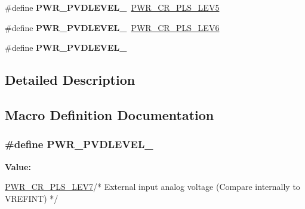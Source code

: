 \begin{DoxyCompactItemize}
\item 
\#define {\bfseries P\+W\+R\+\_\+\+P\+V\+D\+L\+E\+V\+E\+L\+\_}~\hyperlink{group___peripheral___registers___bits___definition_ga326781d09a07b4d215424fbbae11b7b2}{P\+W\+R\+\_\+\+C\+R\+\_\+\+P\+L\+S\+\_\+\+L\+E\+V5}\hypertarget{group___p_w_r___p_v_d__detection__level_ga46a1476440945c2b6426b4973172f24b}{}\label{group___p_w_r___p_v_d__detection__level_ga46a1476440945c2b6426b4973172f24b}

\item 
\#define {\bfseries P\+W\+R\+\_\+\+P\+V\+D\+L\+E\+V\+E\+L\+\_}~\hyperlink{group___peripheral___registers___bits___definition_gaaff17e9c7fe7d837523b1e9a2f4e9baf}{P\+W\+R\+\_\+\+C\+R\+\_\+\+P\+L\+S\+\_\+\+L\+E\+V6}\hypertarget{group___p_w_r___p_v_d__detection__level_ga5dda7d0ac3fd3d606666455ca3c8f537}{}\label{group___p_w_r___p_v_d__detection__level_ga5dda7d0ac3fd3d606666455ca3c8f537}

\item 
\#define {\bfseries P\+W\+R\+\_\+\+P\+V\+D\+L\+E\+V\+E\+L\+\_}
\end{DoxyCompactItemize}


\subsection{Detailed Description}


\subsection{Macro Definition Documentation}
\subsubsection[{\texorpdfstring{P\+W\+R\+\_\+\+P\+V\+D\+L\+E\+V\+E\+L\+\_\+7}{PWR_PVDLEVEL_7}}]{\setlength{\rightskip}{0pt plus 5cm}\#define P\+W\+R\+\_\+\+P\+V\+D\+L\+E\+V\+E\+L\+\_}\hypertarget{group___p_w_r___p_v_d__detection__level_ga2c5cd8dd26b13bdf0164c1f7596b4bfd}{}\label{group___p_w_r___p_v_d__detection__level_ga2c5cd8dd26b13bdf0164c1f7596b4bfd}
{\bfseries Value\+:}
\begin{DoxyCode}
\hyperlink{group___peripheral___registers___bits___definition_ga95e3b301b5470ae94d32c53a9fbdfc8b}{PWR\_CR\_PLS\_LEV7}\textcolor{comment}{/* External input analog voltage }
\textcolor{comment}{                                                          (Compare internally to VREFINT) */}
\end{DoxyCode}
